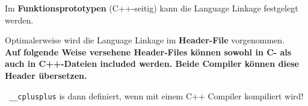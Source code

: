 Im \textbf{Funktionsprototypen} (C++-seitig) kann die Language Linkage festgelegt werden.




Optimalerweise wird die Language Linkage im \textbf{Header-File} vorgenommen. \\
\textbf{Auf folgende Weise versehene Header-Files können sowohl in C- als auch in C++-Dateien included werden.
Beide Compiler können diese Header übersetzen.}



\textrightarrow\ \lstinline|__cplusplus| is dann definiert, wenn mit einem C++ Compiler kompiliert wird!

